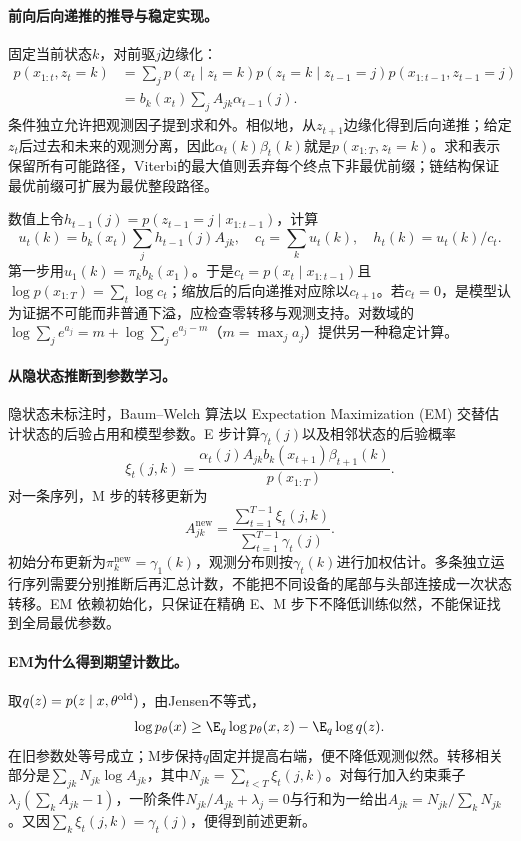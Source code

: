 \paragraph{前向后向递推的推导与稳定实现。}
固定当前状态$k$，对前驱$j$边缘化：
\begin{align}
 p(x_{1:t},z_t=k)
 &=\sum_jp(x_t\mid z_t=k)p(z_t=k\mid z_{t-1}=j)
             p(x_{1:t-1},z_{t-1}=j)\\
 &=b_k(x_t)\sum_jA_{jk}\alpha_{t-1}(j).
\end{align}
条件独立允许把观测因子提到求和外。相似地，从$z_{t+1}$边缘化得到后向递推；给定$z_t$后过去和未来的观测分离，因此$\alpha_t(k)\beta_t(k)$就是$p(x_{1:T},z_t=k)$。求和表示保留所有可能路径，Viterbi的最大值则丢弃每个终点下非最优前缀；链结构保证最优前缀可扩展为最优整段路径。

数值上令$h_{t-1}(j)=p(z_{t-1}=j\mid x_{1:t-1})$，计算
\begin{equation}
 u_t(k)=b_k(x_t)\sum_jh_{t-1}(j)A_{jk},\quad
 c_t=\sum_ku_t(k),\quad h_t(k)=u_t(k)/c_t.
\end{equation}
第一步用$u_1(k)=\pi_kb_k(x_1)$。于是$c_t=p(x_t\mid x_{1:t-1})$且$\log p(x_{1:T})=\sum_t\log c_t$；缩放后的后向递推对应除以$c_{t+1}$。若$c_t=0$，是模型认为证据不可能而非普通下溢，应检查零转移与观测支持。对数域的$\log\sum_j e^{a_j}=m+\log\sum_je^{a_j-m}$（$m=\max_ja_j$）提供另一种稳定计算。

\paragraph{从隐状态推断到参数学习。}
隐状态未标注时，Baum--Welch 算法以 Expectation Maximization (EM) 交替估计状态的后验占用和模型参数。E 步计算$\gamma_t(j)$以及相邻状态的后验概率
\begin{equation}
 \xi_t(j,k)=\frac{\alpha_t(j)A_{jk}b_k(x_{t+1})\beta_{t+1}(k)}{p(x_{1:T})}.
\end{equation}
对一条序列，M 步的转移更新为
\begin{equation}
 A_{jk}^{\mathrm{new}}=
 \frac{\sum_{t=1}^{T-1}\xi_t(j,k)}{\sum_{t=1}^{T-1}\gamma_t(j)}.
\end{equation}
初始分布更新为$\pi_k^{\mathrm{new}}=\gamma_1(k)$，观测分布则按$\gamma_t(k)$进行加权估计。多条独立运行序列需要分别推断后再汇总计数，不能把不同设备的尾部与头部连接成一次状态转移。EM 依赖初始化，只保证在精确 E、M 步下不降低训练似然，不能保证找到全局最优参数。

\paragraph{EM为什么得到期望计数比。}
取$q(z)=p(z\mid x,\theta^{\rm old})$，由Jensen不等式，
\begin{equation}
 \log p_\theta(x)\geq\E_q\log p_\theta(x,z)-\E_q\log q(z).
\end{equation}
在旧参数处等号成立；M步保持$q$固定并提高右端，便不降低观测似然。转移相关部分是$\sum_{jk}N_{jk}\log A_{jk}$，其中$N_{jk}=\sum_{t<T}\xi_t(j,k)$。对每行加入约束乘子$\lambda_j(\sum_kA_{jk}-1)$，一阶条件$N_{jk}/A_{jk}+\lambda_j=0$与行和为一给出$A_{jk}=N_{jk}/\sum_kN_{jk}$。又因$\sum_k\xi_t(j,k)=\gamma_t(j)$，便得到前述更新。

